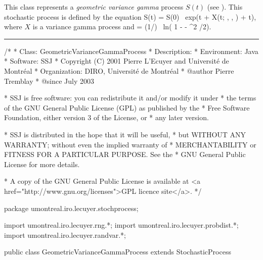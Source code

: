 %
%


This class represents a \emph{geometric variance gamma} process $S(t)$
(see \cite[page 86]{fMAD98a}). This stochastic process is defined by the
equation
\eq
S(t) = S(0) \mbox{ exp}(\mu t + X(t; \sigma, \nu, \theta) + \omega t),
\label{GeoVGeqn}
\endeq
where $X$ is a variance gamma process and
\eq
\omega = (1/\nu) \mbox{ ln}( 1 - \theta \nu - \sigma^{2} \nu /2).
\label{omegaEqn}
\endeq

\bigskip\hrule\bigskip

\begin{code}
\begin{hide}
/*
 * Class:        GeometricVarianceGammaProcess
 * Description:  
 * Environment:  Java
 * Software:     SSJ 
 * Copyright (C) 2001  Pierre L'Ecuyer and Université de Montréal
 * Organization: DIRO, Université de Montréal
 * @author       Pierre Tremblay
 * @since        July 2003

 * SSJ is free software: you can redistribute it and/or modify it under
 * the terms of the GNU General Public License (GPL) as published by the
 * Free Software Foundation, either version 3 of the License, or
 * any later version.

 * SSJ is distributed in the hope that it will be useful,
 * but WITHOUT ANY WARRANTY; without even the implied warranty of
 * MERCHANTABILITY or FITNESS FOR A PARTICULAR PURPOSE.  See the
 * GNU General Public License for more details.

 * A copy of the GNU General Public License is available at
   <a href="http://www.gnu.org/licenses">GPL licence site</a>.
 */
\end{hide}
package umontreal.iro.lecuyer.stochprocess;\begin{hide}
import umontreal.iro.lecuyer.rng.*;
import umontreal.iro.lecuyer.probdist.*;
import umontreal.iro.lecuyer.randvar.*;

\end{hide}

public class GeometricVarianceGammaProcess extends StochasticProcess \begin{hide} {
    protected VarianceGammaProcess vargamma;
    protected double        theta,
                            nu,
                            mu,
                            sigma,
                            omega,
                            muPlusOmega;
    protected double[]      mudt;
\end{hide}
\end{code}
